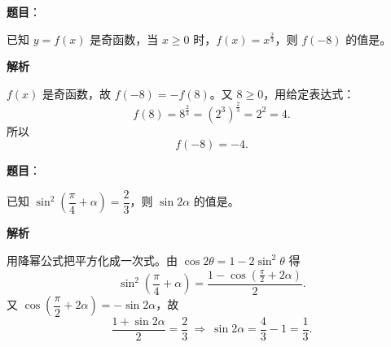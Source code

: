 \begin{answer}

\textbf{题目}：

已知 $y=f(x)$ 是奇函数，当 $x\geqslant0$ 时，$f(x)=x^{\frac23}$，则 $f(-8)$ 的值是\gkblank{}。

\textbf{解析}

$f(x)$ 是奇函数，故 $f(-8)=-f(8)$。又 $8\geqslant0$，用给定表达式：
\nopagebreak[4]
\[f(8)=8^{\frac23}=\left(2^3\right)^{\frac23}=2^2=4 .\]
所以
\nopagebreak[4]
\[f(-8)=-4 .\]


\end{answer}
\begin{answer}

\textbf{题目}：

已知 $\sin^2\left(\dfrac\pi4+\alpha\right)=\dfrac23$，则 $\sin2\alpha$ 的值是\gkblank{}。

\textbf{解析}

用降幂公式把平方化成一次式。由 $\cos2\theta=1-2\sin^2\theta$ 得
\nopagebreak[4]
\[\sin^2\left(\frac\pi4+\alpha\right)=\frac{1-\cos\left(\frac\pi2+2\alpha\right)}2 .\]
又 $\cos\left(\dfrac\pi2+2\alpha\right)=-\sin2\alpha$，故
\nopagebreak[4]
\[\frac{1+\sin2\alpha}{2}=\frac23\ \Longrightarrow\ \sin2\alpha=\frac43-1=\frac13 .\]


\end{answer}
